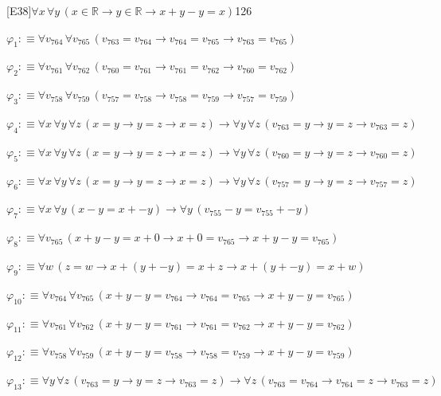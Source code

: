 \begin{fullproof}{[E38]}{$\forall x\,\forall y\,(x \in \mathbb{R} \to y \in \mathbb{R} \to x + y - y = x)$}{126}
\begin{ptree}
\noLine
{}
\noLine
{}
\end{ptree}
\begin{abbrevlist}
\item $\varphi_{1} :\equiv \forall v_{764}\,\forall v_{765}\,(v_{763} = v_{764} \to v_{764} = v_{765} \to v_{763} = v_{765})$
\item $\varphi_{2} :\equiv \forall v_{761}\,\forall v_{762}\,(v_{760} = v_{761} \to v_{761} = v_{762} \to v_{760} = v_{762})$
\item $\varphi_{3} :\equiv \forall v_{758}\,\forall v_{759}\,(v_{757} = v_{758} \to v_{758} = v_{759} \to v_{757} = v_{759})$
\item $\varphi_{4} :\equiv \forall x\,\forall y\,\forall z\,(x = y \to y = z \to x = z) \to \forall y\,\forall z\,(v_{763} = y \to y = z \to v_{763} = z)$
\item $\varphi_{5} :\equiv \forall x\,\forall y\,\forall z\,(x = y \to y = z \to x = z) \to \forall y\,\forall z\,(v_{760} = y \to y = z \to v_{760} = z)$
\item $\varphi_{6} :\equiv \forall x\,\forall y\,\forall z\,(x = y \to y = z \to x = z) \to \forall y\,\forall z\,(v_{757} = y \to y = z \to v_{757} = z)$
\item $\varphi_{7} :\equiv \forall x\,\forall y\,(x - y = x + -y) \to \forall y\,(v_{755} - y = v_{755} + -y)$
\item $\varphi_{8} :\equiv \forall v_{765}\,(x + y - y = x + 0 \to x + 0 = v_{765} \to x + y - y = v_{765})$
\item $\varphi_{9} :\equiv \forall w\,(z = w \to x + (y + -y) = x + z \to x + (y + -y) = x + w)$
\item $\varphi_{10} :\equiv \forall v_{764}\,\forall v_{765}\,(x + y - y = v_{764} \to v_{764} = v_{765} \to x + y - y = v_{765})$
\item $\varphi_{11} :\equiv \forall v_{761}\,\forall v_{762}\,(x + y - y = v_{761} \to v_{761} = v_{762} \to x + y - y = v_{762})$
\item $\varphi_{12} :\equiv \forall v_{758}\,\forall v_{759}\,(x + y - y = v_{758} \to v_{758} = v_{759} \to x + y - y = v_{759})$
\item $\varphi_{13} :\equiv \forall y\,\forall z\,(v_{763} = y \to y = z \to v_{763} = z) \to \forall z\,(v_{763} = v_{764} \to v_{764} = z \to v_{763} = z)$

\end{abbrevlist}
\end{fullproof}
